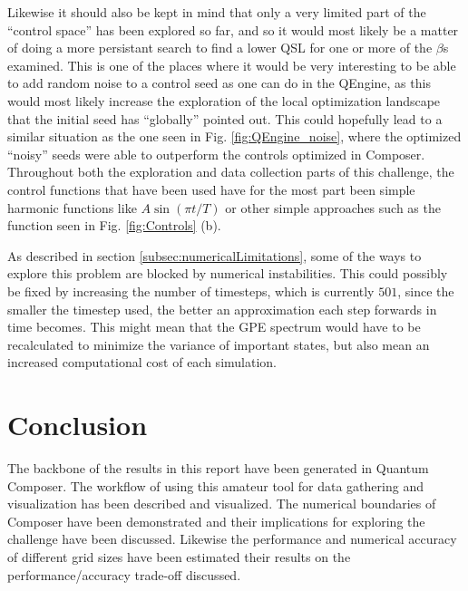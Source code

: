 \documentclass[a4paper, twocolumn]{revtex4-1}
\begin{document}
Likewise it should also be kept in mind that only a very limited part of the ``control space'' has been explored so far, and so it would most likely be a matter of doing a more persistant search to find a lower QSL for one or more of the $\beta$s examined. This is one of the places where it would be very interesting to be able to add random noise to a control seed as one can do in the QEngine, as this would most likely increase the exploration of the local optimization landscape that the initial seed has ``globally'' pointed out. This could hopefully lead to a similar situation as the one seen in Fig. \ref{fig:QEngine_noise}, where the optimized ``noisy'' seeds were able to outperform the controls optimized in Composer.\\


Throughout both the exploration and data collection parts of this challenge, the control functions that have been used have for the most part been simple harmonic functions like $A\sin(\pi t/T)$ or other simple approaches such as the function seen in Fig. \ref{fig:Controls} (b).


As described in section \ref{subsec:numericalLimitations}, some of the ways to explore this problem are blocked by numerical instabilities. This could possibly be fixed by increasing the number of timesteps, which is currently $501$, since the smaller the timestep used, the better an approximation each step forwards in time becomes. This might mean that the GPE spectrum would have to be recalculated to minimize the variance of important states, but also mean an increased computational cost of each simulation.


\section{Conclusion}\label{sec:conclusion}
The backbone of the results in this report have been generated in Quantum Composer. The workflow of using this amateur tool for data gathering and visualization has been described and visualized. %
The numerical boundaries of Composer have been demonstrated and their implications for exploring the challenge have been discussed. Likewise the performance and numerical accuracy of different grid sizes have been estimated their results on the performance/accuracy trade-off discussed.
\end{document}
